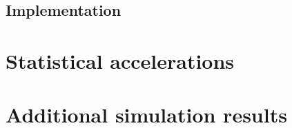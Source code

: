 \documentclass[12pt]{article}
\begin{document}
\begin{appendices}
\subsection{Implementation}

\section{Statistical accelerations}

\section{Additional simulation results}

\end{appendices}


\newpage

\end{document}

